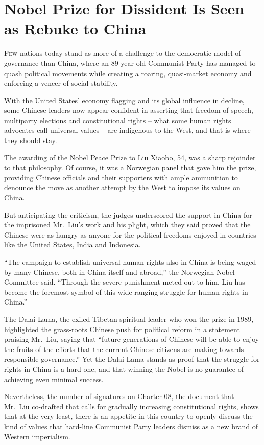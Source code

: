 ﻿\documentclass[12pt]{article}
\begin{document}
\section{Nobel Prize for Dissident Is Seen as Rebuke to China}

\lettrine{F}{ew} nations today stand as more of a challenge to the
democratic model of governance than China, where an 89-year-old Communist Party has managed to quash
political movements while creating a roaring, quasi-market economy and enforcing a veneer of social
stability.

With the United States' economy flagging and its global influence in decline, some Chinese leaders
now appear confident in asserting that freedom of speech, multiparty elections and constitutional
rights -- what some human rights advocates call universal values -- are indigenous to the West, and
that is where they should stay.

The awarding of the Nobel Peace Prize to Liu Xiaobo, 54, was a sharp rejoinder to that philosophy.
Of course, it was a Norwegian panel that gave him the prize, providing Chinese officials and their
supporters with ample ammunition to denounce the move as another attempt by the West to impose its
values on China.

But anticipating the criticism, the judges underscored the support in China for the imprisoned
Mr.~Liu's work and his plight, which they said proved that the Chinese were as hungry as anyone for
the political freedoms enjoyed in countries like the United States, India and Indonesia.

``The campaign to establish universal human rights also in China is being waged by many Chinese,
both in China itself and abroad,'' the Norwegian Nobel Committee said. ``Through the severe
punishment meted out to him, Liu has become the foremost symbol of this wide-ranging struggle for
human rights in China.''

The Dalai Lama, the exiled Tibetan spiritual leader who won the prize in 1989, highlighted the
grass-roots Chinese push for political reform in a statement praising Mr.~Liu, saying that ``future
generations of Chinese will be able to enjoy the fruits of the efforts that the current Chinese
citizens are making towards responsible governance.'' Yet the Dalai Lama stands as proof that the
struggle for rights in China is a hard one, and that winning the Nobel is no guarantee of achieving
even minimal success.

Nevertheless, the number of signatures on Charter 08, the document that Mr.~Liu co-drafted that
calls for gradually increasing constitutional rights, shows that at the very least, there is an
appetite in this country to openly discuss the kind of values that hard-line Communist Party leaders
dismiss as a new brand of Western imperialism.
\end{document}

